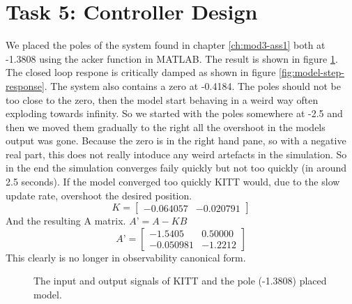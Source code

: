 \documentclass[final]{scrreprt} %
\begin{document}
\section{Task 5: Controller Design}
\label{sec:mod3-tsk5}
We placed the poles of the system found in chapter \ref{ch:mod3-ass1} both at -1.3808 using the acker function in MATLAB.
The result is shown in figure \ref{fig:KITT-input-output-model-output-after-pole-placing}.
The closed loop respone is critically damped as shown in figure \ref{fig:model-step-response}.
The system also contains a zero at -0.4184.
The poles should not be too close to the zero, then the model start behaving in a weird way often exploding towards infinity.
So we started with the poles somewhere at -2.5 and then we moved them gradually to the right all the overshoot in the models output was gone.
Because the zero is in the right hand pane, so with a negative real part, this does not really intoduce any weird artefacts in the simulation.
So in the end the simulation converges faily quickly but not too quickly (in around 2.5 seconds).
If the model converged too quickly KITT would, due to the slow update rate, overshoot the desired position.
\begin{equation}
K=
\begin{bmatrix}
  -0.064057 & -0.020791
 \end{bmatrix}
\end{equation}
And the resulting A matrix. $A’=A-KB$
\begin{equation}
A’=
\begin{bmatrix}
   -1.5405& 0.50000\\
   -0.050981 &  -1.2212
 \end{bmatrix}
\end{equation}
This clearly is no longer in observability canonical form.
\begin{figure}[H]
	\centering
    	\setlength\figureheight{4cm}
    	\setlength{}
    	    	
    	\caption{The input and output signals of KITT and the pole (-1.3808) placed model.}
    	\label{fig:KITT-input-output-model-output-after-pole-placing}
\end{figure}
\end{document}
